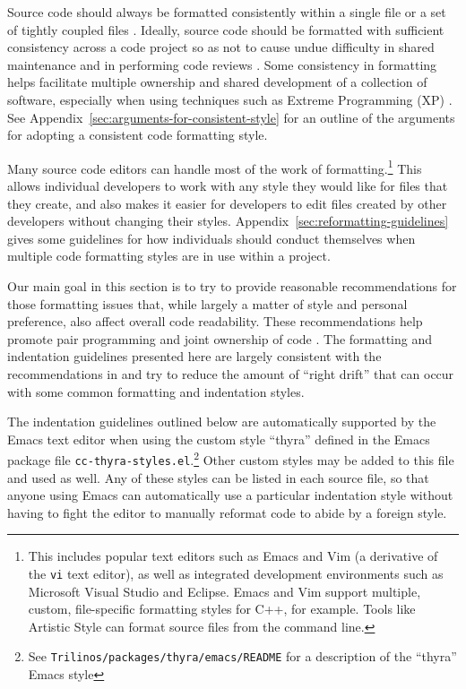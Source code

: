 Source code should always be formatted consistently within a single
file or a set of tightly coupled files \cite[Item
0]{C++CodingStandards05}.  Ideally, source code should be formatted
with sufficient consistency across a code project so as not to cause
undue difficulty in shared maintenance and in performing code reviews
\cite{CodeComplete2nd04}.  Some consistency in formatting helps
facilitate multiple ownership and shared development of a collection
of software, especially when using techniques such as Extreme
Programming (XP) \cite{ExtremeProgrammingExplained99}.  See
Appendix~\ref{sec:arguments-for-consistent-style} for an outline of
the arguments for adopting a consistent code formatting style.

Many source code editors can handle most of the work of
formatting.\footnote{This includes popular text editors such as Emacs
  and Vim (a derivative of the \texttt{vi} text editor), as well as
  integrated development environments such as Microsoft Visual Studio
  and Eclipse.  Emacs and Vim support multiple, custom, file-specific
  formatting styles for C++, for example.  Tools like Artistic Style
  \cite{ArtisticStyle} can format source files from the command line.}
This allows individual developers to work with any style they would
like for files that they create, and also makes it easier for
developers to edit files created by other developers without changing
their styles.  Appendix~\ref{sec:reformatting-guidelines} gives some
guidelines for how individuals should conduct themselves when multiple
code formatting styles are in use within a project.

Our main goal in this section is to try to provide reasonable
recommendations for those formatting issues that, while largely a
matter of style and personal preference, also affect overall code
readability.  These recommendations help promote pair programming and
joint ownership of code \cite{ExtremeProgrammingExplained99}.  The
formatting and indentation guidelines presented here are largely
consistent with the recommendations in \cite[Chapter
31]{CodeComplete2nd04} and try to reduce the amount of ``right drift''
that can occur with some common formatting and indentation styles.

The indentation guidelines outlined below are automatically supported
by the Emacs text editor when using the custom style ``thyra'' defined
in the Emacs package file \texttt{cc-thyra-styles.el}.\footnote{See
  \texttt{Trilinos/packages/thyra/emacs/README} for a description of
  the ``thyra'' Emacs style} Other custom styles may be added to this
file and used as well.  Any of these styles can be listed in each
source file, so that anyone using Emacs can automatically use a
particular indentation style without having to fight the editor to
manually reformat code to abide by a foreign style.


